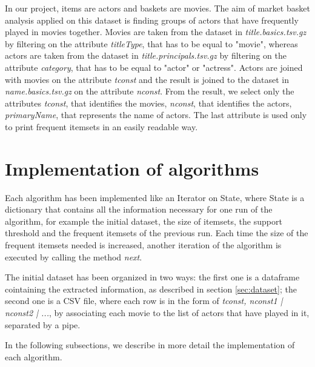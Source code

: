 \documentclass[conference,compsoc]{IEEEtran}
\theoremstyle{definition}
\begin{document}
In our project, items are actors and baskets are movies. The aim of market basket analysis applied on this dataset is finding groups of actors that have frequently played in movies together. Movies are taken from the dataset in \emph{title.basics.tsv.gz} by filtering on the attribute \emph{titleType}, that has to be equal to "movie", whereas actors are taken from the dataset in \emph{title.principals.tsv.gz} by filtering on the attribute \emph{category}, that has to be equal to "actor" or "actress".  Actors are joined with movies on the attribute \emph{tconst} and the result is joined to the dataset in \emph{name.basics.tsv.gz} on the attribute \emph{nconst}. From the result, we select only the attributes \emph{tconst}, that identifies the movies, \emph{nconst}, that identifies the actors, \emph{primaryName}, that represents the name of actors. The last attribute is used only to print frequent itemsets in an easily readable way.  

\section{Implementation of algorithms}
Each algorithm has been implemented like an Iterator on State, where State is a dictionary that contains all the information necessary for one run of the algorithm, for example the initial dataset, the size of itemsets, the support threshold and the frequent itemsets of the previous run.  Each time the size of the frequent itemsets needed is increased, another iteration of the algorithm is executed by calling the method \emph{next}. 

The initial dataset has been organized in two ways: the first one is a dataframe cointaining the extracted information, as described in section \ref{sec:dataset}; the second one is a CSV file, where each row is in the form of \emph{tconst, nconst1 | nconst2 | ...}, by associating each movie to the list of actors that have played in it, separated by a pipe.

In the following subsections, we describe in more detail the implementation of each algorithm.
\end{document}
